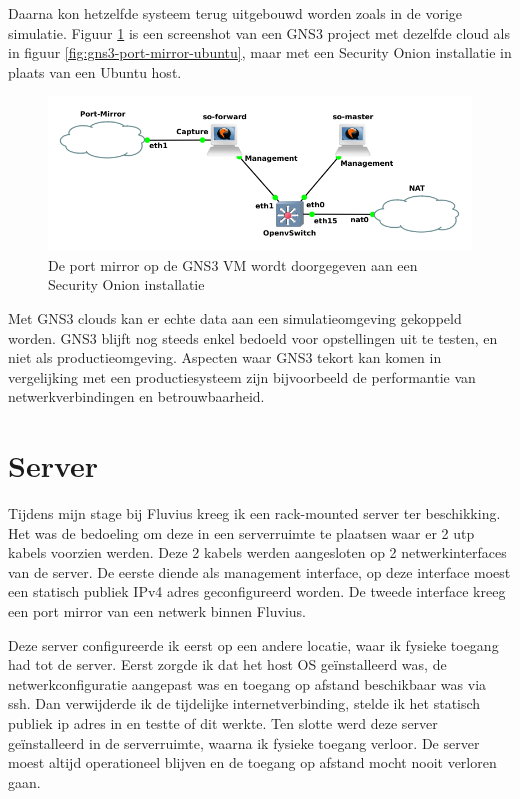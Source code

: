 \documentclass[a4paper,12pt]{report}
\begin{document}
Daarna kon hetzelfde systeem terug uitgebouwd worden zoals in de vorige simulatie.
Figuur \ref{fig:gns3-port-mirror-so} is een screenshot van een GNS3 project met dezelfde cloud als in figuur \ref{fig:gns3-port-mirror-ubuntu}, maar met een Security Onion installatie in plaats van een Ubuntu host.

\begin{figure}[H]
  \centering
  \includegraphics[width=\textwidth]{gns3-port-mirror-so}
  \caption{De port mirror op de GNS3 VM wordt doorgegeven aan een Security Onion installatie}
  \label{fig:gns3-port-mirror-so}
\end{figure}

Met GNS3 clouds kan er echte data aan een simulatieomgeving gekoppeld worden.
GNS3 blijft nog steeds enkel bedoeld voor opstellingen uit te testen, en niet als productieomgeving.
Aspecten waar GNS3 tekort kan komen in vergelijking met een productiesysteem zijn bijvoorbeeld de performantie van netwerkverbindingen en betrouwbaarheid.

\section{Server}
\label{sec:server}
Tijdens mijn stage bij Fluvius kreeg ik een rack-mounted server ter beschikking.
Het was de bedoeling om deze in een serverruimte te plaatsen waar er 2 utp kabels voorzien werden.
Deze 2 kabels werden aangesloten op 2 netwerkinterfaces van de server.
De eerste diende als management interface, op deze interface moest een statisch publiek IPv4 adres geconfigureerd worden.
De tweede interface kreeg een port mirror van een netwerk binnen Fluvius.

Deze server configureerde ik eerst op een andere locatie, waar ik fysieke toegang had tot de server.
Eerst zorgde ik dat het host OS geïnstalleerd was, de netwerkconfiguratie aangepast was en toegang op afstand beschikbaar was via ssh.
Dan verwijderde ik de tijdelijke internetverbinding, stelde ik het statisch publiek ip adres in en testte of dit werkte.
Ten slotte werd deze server geïnstalleerd in de serverruimte, waarna ik fysieke toegang verloor.
De server moest altijd operationeel blijven en de toegang op afstand mocht nooit verloren gaan.
\end{document}
